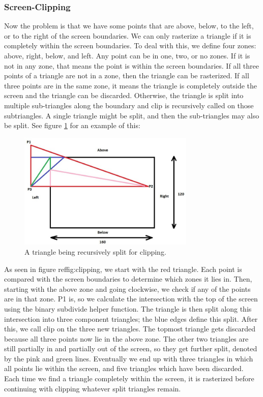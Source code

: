 \documentclass[onecolumn]{IEEEtran}
\begin{document}
\subsubsection{Screen-Clipping}
Now the problem is that we have some points that are above, below, to the left, or to the right of the screen boundaries.  We can only rasterize a triangle if it is completely within the screen boundaries.  To deal with this, we define four zones: above, right, below, and left.  Any point can be in one, two, or no zones.  If it is not in any zone, that means the point is within the screen boundaries.  If all three points of a triangle are not in a zone, then the triangle can be rasterized.  If all three points are in the same zone, it means the triangle is completely outside the screen and the triangle can be discarded.  Otherwise, the triangle is split into multiple sub-triangles along the boundary and clip is recursively called on those subtriangles.  A single triangle might be split, and then the sub-triangles may also be split.  See figure \ref{fig:clipping} for an example of this:

\begin{figure}[H]
	\centering
	\includegraphics[width=0.75\textwidth]{clipping.png}
	\caption{A triangle being recursively split for clipping.}
	\label{fig:clipping}
\end{figure}

As seen in figure ref{fig:clipping}, we start with the red triangle.  Each point is compared with the screen boundaries to determine which zones it lies in.  Then, starting with the above zone and going clockwise, we check if any of the points are in that zone.  P1 is, so we calculate the intersection with the top of the screen using the binary subdivide helper function.  The triangle is then split along this intersection into three component triangles; the blue edges define this split.  After this, we call clip on the three new triangles.  The topmost triangle gets discarded because all three points now lie in the above zone.  The other two triangles are still partially in and partially out of the screen, so they get further split, denoted by the pink and green lines.  Eventually we end up with three triangles in which all points lie within the screen, and five triangles which have been discarded.  Each time we find a triangle completely within the screen, it is rasterized before continuing with clipping whatever split triangles remain.
\end{document}
